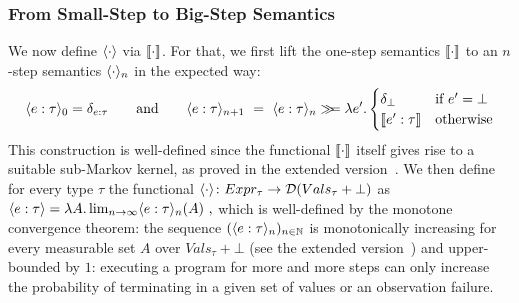 \subsubsection{From Small-Step to Big-Step Semantics}
\label{sec:smallsem_to_bigsem}
%
We now define $\langle \cdot \rangle$ via $\llbracket \cdot \rrbracket$. For that, we first lift the one-step semantics $\llbracket \cdot \rrbracket$ to an $n$-step semantics $\langle \cdot \rangle_{n}$ in the expected way:
%
\begin{align*}
	\langle e : \tau \rangle_{0} =\delta_{e : \tau}  
	\qquad\text{and}\qquad
	\langle e : \tau \rangle_{n+1} ~{}={}~ 
		\langle e : \tau \rangle_{n} \gg\!\!= 
			\lambda e'. 
		\begin{cases}
			\delta_\bot & \text{if $e'=\bot$}\\
		\llbracket e' : \tau \rrbracket  & \text{otherwise}
		\end{cases} 
\end{align*}
%
This construction is well-defined since the functional $\llbracket \cdot \rrbracket$ itself gives rise to a suitable sub-Markov kernel, as proved in the extended version~\cite[Lemma~F.39]{Wu2026SliceExtended}. We then define for every type $\tau$ the functional $\langle \cdot \rangle\colon Expr_\tau \to \mathcal{D}(Vals_\tau + \bot)$ as
%
$
	\langle e:\tau \rangle = \lambda A. \lim_{n\to\infty} \langle e:\tau \rangle_{n}(A)~,
$
% 
which is well-defined by the monotone convergence theorem: the sequence $(\langle e : \tau \rangle_{n})_{n\in\mathbb{N}}$ is monotonically increasing for every measurable set $A$ over $Vals_\tau + \bot$ (see the extended version~\cite[Lemma~F.49]{Wu2026SliceExtended}) and upper-bounded by $1$: executing a program for more and more steps can only increase the probability of terminating in a given set of values or an observation failure.

%
%
%



